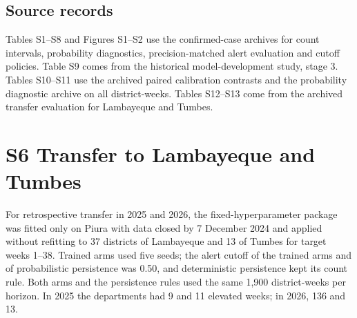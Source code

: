 \documentclass[10pt]{article}
\begin{document}
\subsection*{Source records}
Tables S1--S8 and Figures S1--S2 use the confirmed-case archives for count intervals, probability diagnostics, precision-matched alert evaluation and cutoff policies. Table S9 comes from the historical model-development study, stage 3. Tables S10--S11 use the archived paired calibration contrasts and the probability diagnostic archive on all district-weeks. Tables S12--S13 come from the archived transfer evaluation for Lambayeque and Tumbes.

\clearpage
\section*{S6 Transfer to Lambayeque and Tumbes}
For retrospective transfer in 2025 and 2026, the fixed-hyperparameter package was fitted only on Piura with data closed by 7 December 2024 and applied without refitting to 37 districts of Lambayeque and 13 of Tumbes for target weeks 1--38. Trained arms used five seeds; the alert cutoff of the trained arms and of probabilistic persistence was 0.50, and deterministic persistence kept its count rule. Both arms and the persistence rules used the same 1,900 district-weeks per horizon. In 2025 the departments had 9 and 11 elevated weeks; in 2026, 136 and 13.
\end{document}
